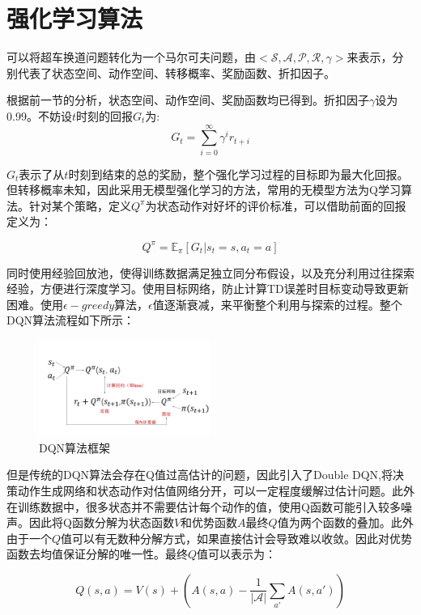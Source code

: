 \documentclass[letterpaper, 10 pt, conference]{ieeeconf}  %
\begin{document}
\section{强化学习算法}
可以将超车换道问题转化为一个马尔可夫问题，由$<\mathcal{S},\mathcal{A},\mathcal{P},\mathcal{R},\gamma>$来表示，分别代表了状态空间、动作空间、转移概率、奖励函数、折扣因子。

根据前一节的分析，状态空间、动作空间、奖励函数均已得到。折扣因子$\gamma$设为0.99。不妨设$t$时刻的回报$G_t$为:
$$
G_t = \sum^{\infty}_{i=0}\gamma^ir_{t+i}
$$

$G_t$表示了从$t$时刻到结束的总的奖励，整个强化学习过程的目标即为最大化回报。但转移概率未知，因此采用无模型强化学习的方法，常用的无模型方法为Q学习算法。针对某个策略，定义$Q^\pi$为状态动作对好坏的评价标准，可以借助前面的回报定义为：

$$
Q^\pi = \mathbb{E}_\pi[G_t|s_t=s,a_t=a]
$$

同时使用经验回放池，使得训练数据满足独立同分布假设，以及充分利用过往探索经验，方便进行深度学习。使用目标网络，防止计算TD误差时目标变动导致更新困难。使用$\epsilon-greedy$算法，$\epsilon$值逐渐衰减，来平衡整个利用与探索的过程。整个DQN算法流程如下所示：

\begin{figure}[htbp] %
    \centering %
    \includegraphics[width=0.5\textwidth]{fig/2.JPG} %
    \caption{DQN算法框架} %
    \label{Fig.main2} %
\end{figure}


但是传统的DQN算法会存在Q值过高估计的问题，因此引入了Double DQN,将决策动作生成网络和状态动作对估值网络分开，可以一定程度缓解过估计问题。此外在训练数据中，很多状态并不需要估计每个动作的值，使用Q函数可能引入较多噪声。因此将Q函数分解为状态函数$V$和优势函数$A$最终$Q$值为两个函数的叠加。此外由于一个$Q$值可以有无数种分解方式，如果直接估计会导致难以收敛。因此对优势函数去均值保证分解的唯一性。最终$Q$值可以表示为：

$$
Q(s,a) = V(s)+(A(s,a)-\frac{1}{|\mathcal{A}|}\sum_{a'}A(s,a'))
$$
\end{document}
